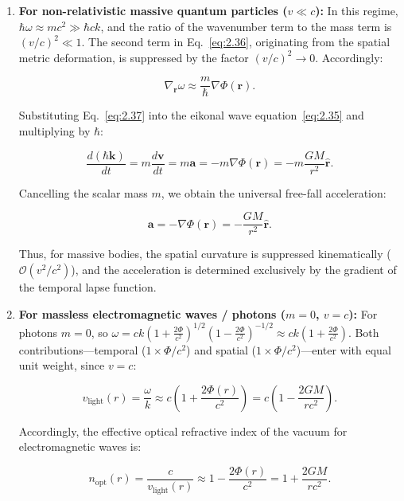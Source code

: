\begin{enumerate}
\item \textbf{For non-relativistic massive quantum particles ($v \ll c$):}  
In this regime, $\hbar \omega \approx m c^2 \gg \hbar c k$, and the ratio of the wavenumber term to the mass term is $(v/c)^2 \ll 1$. The second term in Eq.~\eqref{eq:2.36}, originating from the spatial metric deformation, is suppressed by the factor $(v/c)^2 \to 0$. Accordingly:

\begin{equation}\label{eq:2.37}\label{eq:2.87}\tag{2.37}
\nabla_{\mathbf{r}}\omega \approx \frac{m}{\hbar} \nabla\Phi(\mathbf{r}).
\end{equation}

Substituting Eq.~\eqref{eq:2.37} into the eikonal wave equation~\eqref{eq:2.35} and multiplying by $\hbar$:

\begin{equation}\label{eq:2.38}\label{eq:2.88}\tag{2.38}
\frac{d(\hbar \mathbf{k})}{dt} = m \frac{d\mathbf{v}}{dt} = m \mathbf{a} = -m \nabla \Phi(\mathbf{r}) = -m \frac{GM}{r^2}\hat{\mathbf{r}}.
\end{equation}

Cancelling the scalar mass $m$, we obtain the universal free-fall acceleration:

\begin{equation}\label{eq:2.39}\label{eq:2.89}\tag{2.39}
\mathbf{a} = -\nabla\Phi(\mathbf{r}) = -\frac{GM}{r^2} \hat{\mathbf{r}}.
\end{equation}

Thus, for massive bodies, the spatial curvature is suppressed kinematically ($\mathcal{O}(v^2/c^2)$), and the acceleration is determined exclusively by the gradient of the temporal lapse function.

\item \textbf{For massless electromagnetic waves / photons ($m = 0$, $v = c$):}  
For photons $m = 0$, so $\omega = c k \left(1 + \frac{2\Phi}{c^2}\right)^{1/2}\left(1 - \frac{2\Phi}{c^2}\right)^{-1/2} \approx c k \left(1 + \frac{2\Phi}{c^2}\right)$. Both contributions---temporal ($1 \times \Phi/c^2$) and spatial ($1 \times \Phi/c^2$)---enter with equal unit weight, since $v = c$:

\begin{equation}\label{eq:2.40}\label{eq:2.90}\tag{2.40}
v_{\text{light}}(r) = \frac{\omega}{k} \approx c \left( 1 + \frac{2\Phi(r)}{c^2} \right) = c \left( 1 - \frac{2GM}{r c^2} \right).
\end{equation}

Accordingly, the effective optical refractive index of the vacuum for electromagnetic waves is:

\begin{equation}\label{eq:2.41}\label{eq:2.91}\tag{2.41}
n_{\text{opt}}(r) = \frac{c}{v_{\text{light}}(r)} \approx 1 - \frac{2\Phi(r)}{c^2} = 1 + \frac{2GM}{r c^2}.
\end{equation}
\end{enumerate}


